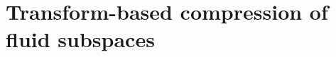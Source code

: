 \chapter[Transform-based compression of fluid subspaces]{Transform-based compression of fluid subspaces}